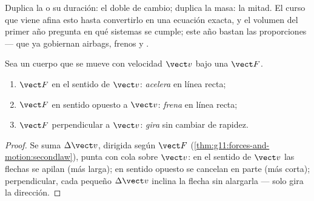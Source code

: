 \begin{remark}
Duplica la  o su duración: el doble de cambio; duplica la masa: la
mitad. El curso que viene afina esto hasta convertirlo en una ecuación
exacta, y el volumen del primer año pregunta en qué sistemas se cumple;
este año bastan las proporciones --- que ya gobiernan airbags, frenos y
.
\end{remark}

\begin{proposition}\label{prop:g11:forces-and-motion:cases}
Sea un cuerpo que se mueve con velocidad $\vect v$ bajo una 
$\vect F$.
\begin{enumerate}
  \item $\vect F$ en el sentido de $\vect v$: \emph{acelera} en línea
        recta;
  \item $\vect F$ en sentido opuesto a $\vect v$: \emph{frena} en línea
        recta;
  \item $\vect F$ perpendicular a $\vect v$: \emph{gira} sin cambiar de
        rapidez.
\end{enumerate}
\end{proposition}

\begin{proof}
Se suma $\Delta\vect v$, dirigida según $\vect F$
(\cref{thm:g11:forces-and-motion:secondlaw}), punta con cola sobre
$\vect v$: en el sentido de $\vect v$ las flechas se apilan (más larga);
en sentido opuesto se cancelan en parte (más corta); perpendicular, cada
pequeño $\Delta \vect v$ inclina la flecha sin alargarla --- solo gira
la dirección.
\end{proof}

